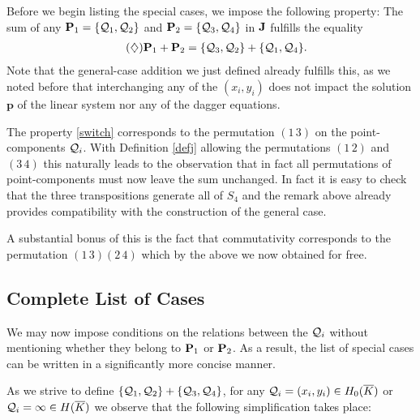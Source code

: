\documentclass[english,11pt,a4paper]{article}
\begin{document}
Before we begin listing the special cases, we impose the following property: The sum of any $\P_1 = \{\q_1,\q_2\}$ and $\P_2 = \{\q_3,\q_4\}$ in $\J$ fulfills the equality
\begin{align*}
  \tag{$\diamondsuit$} \label{switch} \P_1 + \P_2 &= \{\q_3,\q_2\} + \{\q_1,\q_4\}.
\end{align*}
Note that the general-case addition we just defined already fulfills this, as we noted before that interchanging any of the $(x_i, y_i)$ does not impact the solution $\mathbf{p}$ of the linear system nor any of the dagger equations.

\begin{remark}\label{permut}
  The property \eqref{switch} corresponds to the permutation $(1 \, 3)$ on the point-components $\q_i$. With Definition \ref{defj} allowing the permutations $(1 \, 2)$ and $(3 \, 4)$ this naturally leads to the observation that in fact all permutations of point-components must now leave the sum unchanged. In fact it is easy to check that the three transpositions generate all of $S_4$ and the remark above already provides compatibility with the construction of the general case.

  A substantial bonus of this is the fact that commutativity corresponds to the permutation $(1 \, 3)(2 \, 4)$ which by the above we now obtained for free.
\end{remark}


\subsection{Complete List of Cases}

We may now impose conditions on the relations between the $\q_i$ without mentioning whether they belong to $\P_1$ or $\P_2$. As a result, the list of special cases can be written in a significantly more concise manner.

As we strive to define $\{ \q_1 , \q_2 \} + \{ \q_3 , \q_4 \}$, for any $\q_i = (x_i,y_i) \in \enkb$ or $\q_i = \infty \in \ekb$ we observe that the following simplification takes place:
\end{document}
